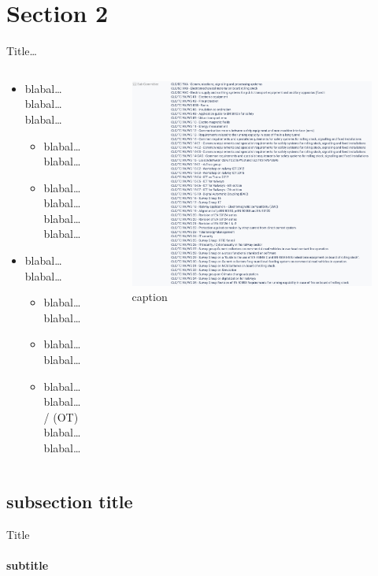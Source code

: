 
\section{Section 2}

\begin{frame}{Title\ldots }
\begin{columns}[T]
    \begin{column}{.7\linewidth}
      \begin{itemize}
			\item blabal\ldots blabal\ldots blabal\ldots
				\begin{itemize}
					\item blabal\ldots blabal\ldots
					\item blabal\ldots blabal\ldots blabal\ldots blabal\ldots
					
				\end{itemize}
			\item blabal\ldots blabal\ldots
				\begin{itemize}
					\item blabal\ldots blabal\ldots
					\item blabal\ldots blabal\ldots
					\item blabal\ldots blabal\ldots/ \alert{(OT)} blabal\ldots blabal\ldots 				\end{itemize}
		\end{itemize}
    \end{column}
    \begin{column}{.3\linewidth}
    \begin{figure}[hbt]
  \includegraphics[width=\textwidth]{gfx/standards.jpg}
  \caption{caption}
\end{figure}

    \end{column}  
  \end{columns}
\end{frame}



\subsection*{subsection title}
\begin{frame}{Title}
	\framesubtitle{subtitle}
\end{frame}
